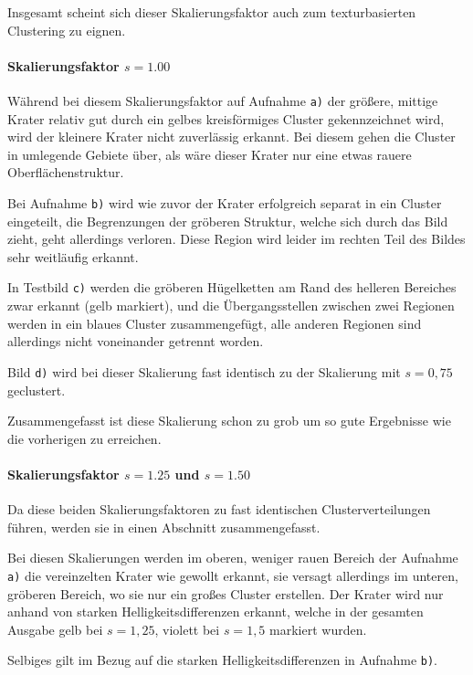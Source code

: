 Insgesamt scheint sich dieser Skalierungsfaktor auch zum texturbasierten Clustering zu eignen.

\paragraph{Skalierungsfaktor $s=1.00$}

Während bei diesem Skalierungsfaktor auf Aufnahme \texttt{a)} der größere, mittige Krater relativ gut durch ein gelbes kreisförmiges Cluster gekennzeichnet wird, wird der kleinere Krater nicht zuverlässig erkannt. Bei diesem gehen die Cluster in umlegende Gebiete über, als wäre dieser Krater nur eine etwas rauere Oberflächenstruktur.

Bei Aufnahme \texttt{b)} wird wie zuvor der Krater erfolgreich separat in ein Cluster eingeteilt, die Begrenzungen der gröberen Struktur, welche sich durch das Bild zieht, geht allerdings verloren. Diese Region wird leider im rechten Teil des Bildes sehr weitläufig erkannt.

In Testbild \texttt{c)} werden die gröberen Hügelketten am Rand des helleren Bereiches zwar erkannt (gelb markiert), und die Übergangsstellen zwischen zwei Regionen werden in ein blaues Cluster zusammengefügt, alle anderen Regionen sind allerdings nicht voneinander getrennt worden.

Bild \texttt{d)} wird bei dieser Skalierung fast identisch zu der Skalierung mit $s=0,75$ geclustert.

Zusammengefasst ist diese Skalierung schon zu grob um so gute Ergebnisse wie die vorherigen zu erreichen.

\paragraph{Skalierungsfaktor $s=1.25$ und $s=1.50$}

Da diese beiden Skalierungsfaktoren zu fast identischen Clusterverteilungen führen, werden sie in einen Abschnitt zusammengefasst.

Bei diesen Skalierungen werden im oberen, weniger rauen Bereich der Aufnahme \texttt{a)} die vereinzelten Krater wie gewollt erkannt, sie versagt allerdings im unteren, gröberen Bereich, wo sie nur ein großes Cluster erstellen. Der Krater wird nur anhand von starken Helligkeitsdifferenzen erkannt, welche in der gesamten Ausgabe gelb bei $s=1,25$, \bzw violett bei $s=1,5$ markiert wurden. 

Selbiges gilt im Bezug auf die starken Helligkeitsdifferenzen in Aufnahme \texttt{b)}.

